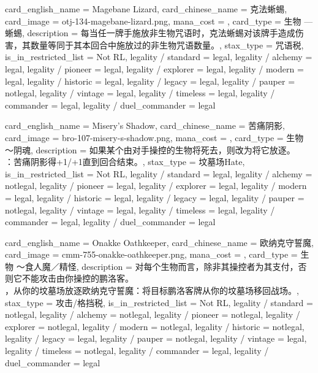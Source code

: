 \documentclass[lang = cn, color = black, 10pt]{AllThatStax}
\begin{document}
\card
{
	card_english_name = {Magebane Lizard},
	card_chinese_name = {克法蜥蜴},
	card_image = otj-134-magebane-lizard.png,
	mana_cost = ,
	card_type = 生物 — 蜥蜴,
	description = {每当任一牌手施放非生物咒语时，克法蜥蜴对该牌手造成伤害，其数量等同于其本回合中施放过的非生物咒语数量。},
	stax_type = 咒语税,
	is_in_restricted_list = Not RL,
	legality / standard = legal,
	legality / alchemy = legal,
	legality / pioneer = legal,
	legality / explorer = legal,
	legality / modern = legal,
	legality / historic = legal,
	legality / legacy = legal,
	legality / pauper = notlegal,
	legality / vintage = legal,
	legality / timeless = legal,
	legality / commander = legal,
	legality / duel_commander = legal
}

\card
{
	card_english_name = {Misery's Shadow},
	card_chinese_name = {苦痛阴影},
	card_image = bro-107-misery-s-shadow.png,
	mana_cost = ,
	card_type = 生物 ～阴魂,
	description = {如果某个由对手操控的生物将死去，则改为将它放逐。\\
		：苦痛阴影得+1/+1直到回合结束。},
	stax_type = 坟墓场Hate,
	is_in_restricted_list = Not RL,
	legality / standard = legal,
	legality / alchemy = notlegal,
	legality / pioneer = legal,
	legality / explorer = legal,
	legality / modern = legal,
	legality / historic = legal,
	legality / legacy = legal,
	legality / pauper = notlegal,
	legality / vintage = legal,
	legality / timeless = legal,
	legality / commander = legal,
	legality / duel_commander = legal
}

\card
{
	card_english_name = {Onakke Oathkeeper},
	card_chinese_name = {欧纳克守誓魔},
	card_image = cmm-755-onakke-oathkeeper.png,
	mana_cost = ,
	card_type = 生物 ～食人魔／精怪,
	description = {对每个生物而言，除非其操控者为其支付，否则它不能攻击由你操控的鹏洛客。\\
		，从你的坟墓场放逐欧纳克守誓魔：将目标鹏洛客牌从你的坟墓场移回战场。},
	stax_type = 攻击/格挡税,
	is_in_restricted_list = Not RL,
	legality / standard = notlegal,
	legality / alchemy = notlegal,
	legality / pioneer = notlegal,
	legality / explorer = notlegal,
	legality / modern = notlegal,
	legality / historic = notlegal,
	legality / legacy = legal,
	legality / pauper = notlegal,
	legality / vintage = legal,
	legality / timeless = notlegal,
	legality / commander = legal,
	legality / duel_commander = legal
}
\end{document}
